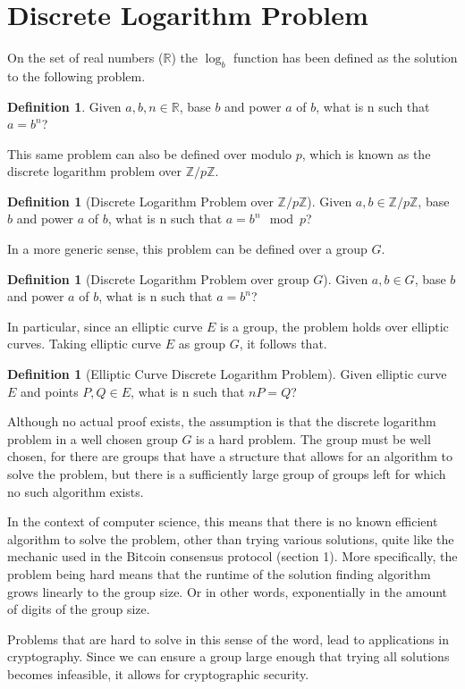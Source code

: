 \documentclass[12pt]{report}
\theoremstyle{plain}
\theoremstyle{definition}
\newtheorem{defn}[thm]{Definition} %
\begin{document}
	\section{Discrete Logarithm Problem}
	On the set of real numbers ($\mathbb{R}$) the $\log_b$ function has been defined as the solution to the following problem.
	\begin{defn}
		Given $a,b,n\in\mathbb{R}$, base $b$ and power $a$ of $b$, what is n such that $a=b^n$?
	\end{defn}
	This same problem can also be defined over modulo $p$, which is known as the discrete logarithm problem over $\mathbb{Z}/p\mathbb{Z}$.
	\begin{defn}[Discrete Logarithm Problem over $\mathbb{Z}/p\mathbb{Z}$]
		Given $a,b\in\mathbb{Z}/p\mathbb{Z}$, base $b$ and power $a$ of $b$, what is n such that $a=b^n\mod{p}$?
	\end{defn}
	In a more generic sense, this problem can be defined over a group $G$.
	\begin{defn}[Discrete Logarithm Problem over group $G$]
		Given $a,b\in G$, base $b$ and power $a$ of $b$, what is n such that $a=b^n$?
	\end{defn}
	In particular, since an elliptic curve $E$ is a group, the problem holds over elliptic curves. Taking elliptic curve $E$ as group $G$, it follows that.
	\begin{defn}[Elliptic Curve Discrete Logarithm Problem]
		Given elliptic curve $E$ and points $P,Q\in E$, what is n such that $nP=Q$?
	\end{defn}
	Although no actual proof exists, the assumption is that the discrete logarithm problem in a well chosen group $G$ is a hard problem. The group must be well chosen, for there are groups that have a structure that allows for an algorithm to solve the problem, but there is a sufficiently large group of groups left for which no such algorithm exists.
	
	In the context of computer science, this means that there is no known efficient algorithm to solve the problem, other than trying various solutions, quite like the mechanic used in the Bitcoin consensus protocol (section 1). More specifically, the problem being hard means that the runtime of the solution finding algorithm grows linearly to the group size. Or in other words, exponentially in the amount of digits of the group size.
	
	Problems that are hard to solve in this sense of the word, lead to applications in cryptography. Since we can ensure a group large enough that trying all solutions becomes infeasible, it allows for cryptographic security.
\end{document}
